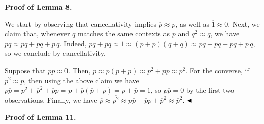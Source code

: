 \documentclass[10pt,a4paper]{amsart}
\begin{document}
 
 
 
\par\medskip\noindent\textbf{Proof of Lemma 8.}\par
 
 
We start by observing that cancellativity implies $\overline{\overline{p}}\approx p$, as well as $\overline{1}\approx 0$. Next, we claim that, whenever $q$ matches the same contexts as $p$ and $q^{2}\approx q$, we have $\overline{pq}\approx\overline{p}q+p\overline{q}+\overline{p}\,\overline{q}$. Indeed, $pq+\overline{pq}\approx 1\approx(p+\overline{p})(q+\overline{q})\approx pq+%
\overline{p}q+p\overline{q}+\overline{p}\,\overline{q}$, so we conclude by cancellativity.\par
 
 
 
Suppose that $p\overline{p}\approx 0$. Then, $p\approx p(p+\overline{p})\approx p^{2}+p\overline{p}\approx p^{2}$. For the converse, if $p^{2}\approx p$, then using the above claim we have $\overline{p\overline{p}}=p^{2}+\overline{p}^{2}+\overline{p}p=p+\overline{p}(%
\overline{p}+p)=p+\overline{p}=1$, so $p\overline{p}=0$ by the first two observations. Finally, we have $\overline{p}\approx\overline{p^{2}}\approx p\overline{p}+\overline{p}p+%
\overline{p}^{2}\approx\overline{p}^{2}$. $\hfill\blacktriangleleft$\par
 
 
 
 
\par\medskip\noindent\textbf{Proof of Lemma 11.}\par
 
 
\end{document}
